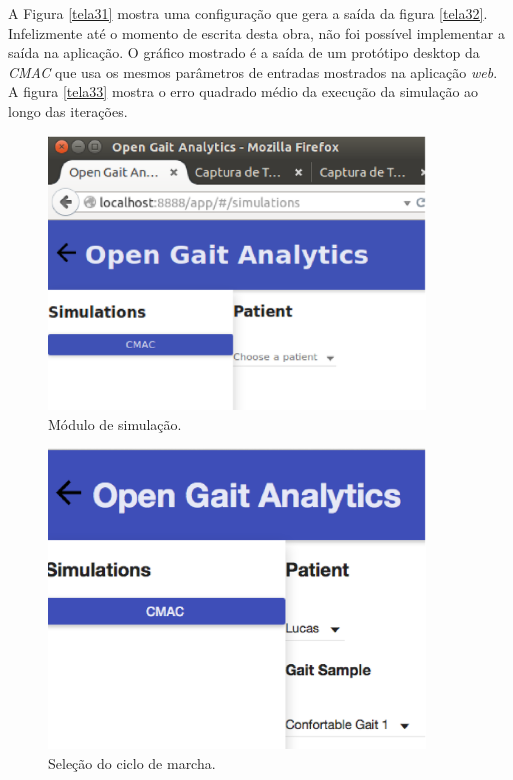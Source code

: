 A Figura \ref{tela31} mostra uma configuração que gera a saída da figura \ref{tela32}. Infelizmente até o momento de escrita desta obra, não foi possível implementar a saída na aplicação. O gráfico mostrado é a saída de um protótipo desktop da \emph{CMAC} que usa os mesmos parâmetros de entradas mostrados na aplicação \emph{web}.
A figura \ref{tela33} mostra o erro quadrado médio da execução da simulação ao longo das iterações.

\begin{figure}[ht]
	\centering
	\includegraphics[width=10cm]{figuras/tela27.eps}
	\caption{Módulo de simulação.}
\label{tela27}
\end{figure}

\begin{figure}[ht]
	\centering
	\includegraphics[width=10cm]{figuras/tela28.eps}
	\caption{Seleção do ciclo de marcha.}
\label{tela28}
\end{figure}

